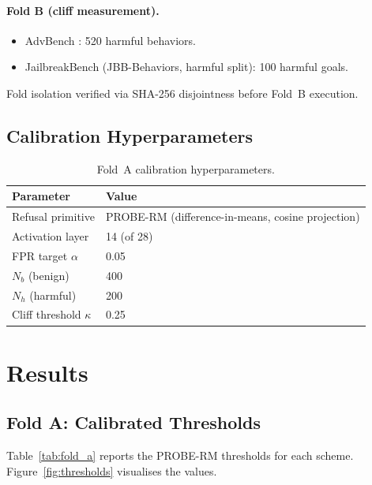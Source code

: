 \documentclass[11pt,a4paper]{article}
\newcommand{\kap}{\kappa}
\begin{document}
\paragraph{Fold B (cliff measurement).}
\begin{itemize}[leftmargin=1.5em, itemsep=1pt]
  \item AdvBench \citep{zou2023advbench}: 520 harmful behaviors.
  \item JailbreakBench \citep{chao2024jailbreakbench} (JBB-Behaviors, harmful
        split): 100 harmful goals.
\end{itemize}
Fold isolation verified via SHA-256 disjointness before Fold~B execution.

\subsection{Calibration Hyperparameters}

\begin{table}[H]
  \centering
  \caption{Fold~A calibration hyperparameters.}
  \label{tab:hyperparams}
  \begin{tabular}{ll}
    \toprule
    Parameter & Value \\
    \midrule
    Refusal primitive   & PROBE-RM (difference-in-means, cosine projection) \\
    Activation layer    & 14 (of 28) \\
    FPR target $\alpha$ & 0.05 \\
    $N_b$ (benign)      & 400 \\
    $N_h$ (harmful)     & 200 \\
    Cliff threshold $\kap$ & 0.25 \\
    \bottomrule
  \end{tabular}
\end{table}

\section{Results}
\label{sec:results}

\subsection{Fold A: Calibrated Thresholds}

Table~\ref{tab:fold_a} reports the PROBE-RM thresholds for each scheme.
Figure~\ref{fig:thresholds} visualises the values.
\end{document}
